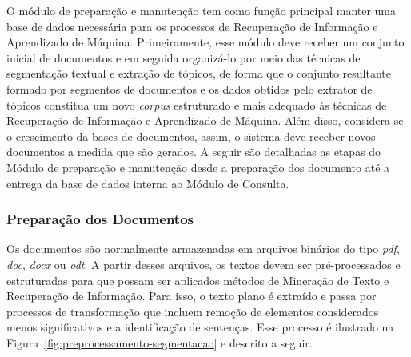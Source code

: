 O módulo de preparação e manutenção tem como função principal manter uma base de dados necessária para os processos de Recuperação de Informação e Aprendizado de Máquina. Primeiramente, esse módulo deve receber um conjunto inicial de documentos e em seguida organizá-lo por meio das técnicas de segmentação textual e extração de tópicos, de forma que o conjunto resultante formado por segmentos de documentos e os dados obtidos pelo extrator de tópicos constitua um novo \textit{corpus} estruturado e mais adequado às técnicas de Recuperação de Informação e Aprendizado de Máquina. Além disso, considera-se o crescimento da bases de documentos, assim, o sistema deve receber novos documentos a medida que são gerados. A seguir são detalhadas as etapas do Módulo de preparação e manutenção desde a preparação dos documento até a entrega da base de dados interna ao Módulo de Consulta. 






\subsubsection{Preparação dos Documentos}


Os documentos são normalmente armazenadas em arquivos binários do tipo \textit{pdf}, \textit{doc}, \textit{docx} ou \textit{odt}. A partir desses arquivos, os textos devem ser pré-processados e estruturadas para que possam ser aplicados métodos de Mineração de Texto e Recuperação de Informação. Para isso, o texto plano é extraído e passa por processos de transformação que incluem remoção de elementos considerados menos significativos e a identificação de sentenças. Esse processo é ilustrado na Figura~\ref{fig:preprocessamento-segmentacao} e descrito a seguir.

